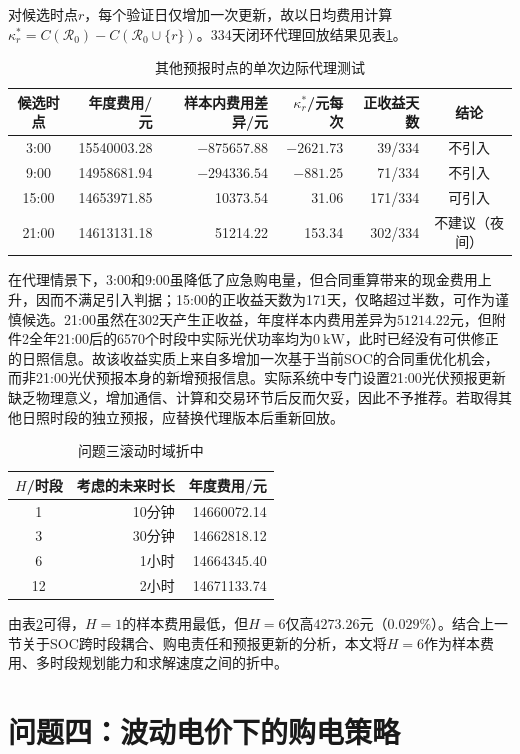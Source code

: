 \documentclass[UTF8,12pt,a4paper]{ctexart}
\theoremstyle{remark}
\begin{document}
对候选时点$r$，每个验证日仅增加一次更新，故以日均费用计算
$\kappa_r^*=C(\mathcal R_0)-C(\mathcal R_0\cup\{r\})$。334天闭环代理回放结果见表\ref{tab:q3-extra-time}。
\begin{table}[H]\centering\small
\caption{其他预报时点的单次边际代理测试}\label{tab:q3-extra-time}
\begin{tabular}{crrrrc}\toprule
候选时点&年度费用/元&样本内费用差异/元&$\kappa_r^*$/元每次&正收益天数&结论\\\midrule
3:00&15540003.28&$-875657.88$&$-2621.73$&39/334&不引入\\
9:00&14958681.94&$-294336.54$&$-881.25$&71/334&不引入\\
15:00&14653971.85&10373.54&31.06&171/334&可引入\\
21:00&14613131.18&51214.22&153.34&302/334&不建议（夜间）\\\bottomrule
\end{tabular}
\end{table}
在代理情景下，3:00和9:00虽降低了应急购电量，但合同重算带来的现金费用上升，因而不满足引入判据；15:00的正收益天数为171天，仅略超过半数，可作为谨慎候选。21:00虽然在302天产生正收益，年度样本内费用差异为$51214.22$元，但附件2全年21:00后的6570个时段中实际光伏功率均为$0\ \mathrm{kW}$，此时已经没有可供修正的日照信息。故该收益实质上来自多增加一次基于当前SOC的合同重优化机会，而非21:00光伏预报本身的新增预报信息。实际系统中专门设置21:00光伏预报更新缺乏物理意义，增加通信、计算和交易环节后反而欠妥，因此不予推荐。若取得其他日照时段的独立预报，应替换代理版本后重新回放。

\begin{table}[H]\centering\caption{问题三滚动时域折中}\label{tab:q3-horizon}
\begin{tabular}{crr}\toprule
$H$/时段&考虑的未来时长&年度费用/元\\\midrule
1&10分钟&14660072.14\\3&30分钟&14662818.12\\
6&1小时&14664345.40\\12&2小时&14671133.74\\\bottomrule
\end{tabular}\end{table}
由表\ref{tab:q3-horizon}可得，$H=1$的样本费用最低，但$H=6$仅高$4273.26$元（$0.029\%$）。结合上一节关于SOC跨时段耦合、购电责任和预报更新的分析，本文将$H=6$作为样本费用、多时段规划能力和求解速度之间的折中。

\section{问题四：波动电价下的购电策略}
\end{document}
